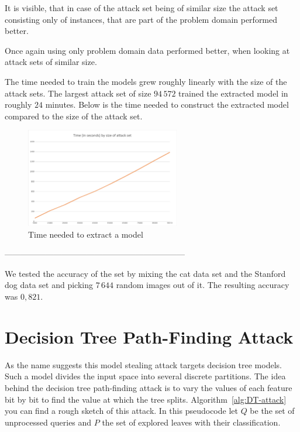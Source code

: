 \documentclass[a4paper,11pt]{article}
\begin{document}
        It is visible, that in case of the attack set being of similar size the attack set consisting only of instances, that are part of the problem domain performed better. 
        
        Once again using only problem domain data performed better, when looking at attack sets of similar size.
        
    
    The time needed to train the models grew roughly linearly with the size of the attack sets. The largest attack set of size $94\,572$ trained the extracted model in roughly $24$ minutes. Below is the time needed to construct the extracted model compared to the size of the attack set.
        \begin{figure}[h!]
            \centering      \includegraphics[width=0.6\textwidth]{exercise_3/paper/images/Time_copy_cat.png}
            \caption{Time needed to extract a model}
            \label{fig:time_cat}
        \end{figure}
        
        
        ------------------------------------------------------------------
        
        We tested the accuracy of the set by mixing the cat data set and the Stanford dog data set and picking $7\,644$ random images out of it. The resulting accuracy was $0,821$. 
            
\section{Decision Tree Path-Finding Attack}
    As the name suggests this model stealing attack targets decision tree models. Such a model divides the input space into several discrete partitions. The idea behind the decision tree path-finding attack is to vary the values of each feature bit by bit to find the value at which the tree splits. Algorithm~\ref{alg:DT-attack} you can find a rough sketch of this attack. In this pseudocode let $Q$ be the set of unprocessed queries and $P$ the set of explored leaves with their classification.
    
\end{document}
